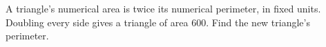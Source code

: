 A triangle's numerical area is twice its numerical perimeter, in fixed units. Doubling every side gives a triangle of area 600. Find the new triangle's perimeter.
